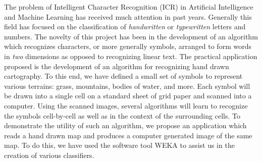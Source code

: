The problem of Intelligent Character Recognition (ICR) in Artificial
Intelligence and Machine Learning has received much attention in past years.
Generally this field has focused on the classification of \emph{handwritten}
or \emph{typewritten} letters and numbers.  The novelty of this project has been
in the development of an algorithm which recognizes characters, or more
generally symbols, arranged to form words in \emph{two} dimensions as opposed
to recognizing linear text. The practical application proposed is the
development of an algorithm for recognizing hand drawn cartography. To this
end, we have defined a small set of symbols to represent various terrains:
grass, mountains, bodies of water, and more. Each symbol will be drawn into a
single cell on a standard sheet of grid paper and scanned into a computer.
Using the scanned images, several algorithms will learn to recognize the
symbols cell-by-cell as well as in the context of the surrounding cells. To
demonstrate the utility of such an algorithm, we propose an application which
reads a hand drawn map and produces a computer generated image of the same map.
To do this, we have used the software tool WEKA\cite{hall2009} to assist us in
the creation of various classifiers.

